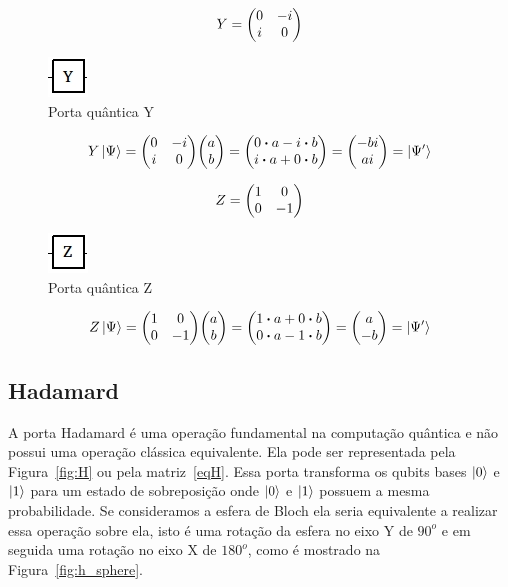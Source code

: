 \documentclass[a4paper, 12pt, oneside]{book}
\begin{document}
\begin{equation}\label{eqY}
Y =  \mqty(0&-i\\i&0)
\end{equation}

\begin{figure}[H]
\centering
\includegraphics[scale=0.75]{y.jpg}
\caption{Porta quântica Y}
\label{fig:y}
\end{figure}

\begin{align*}
Y\ket{\Psi} = \mqty(0&-i\\i&0)\mqty(a\\b) = \mqty(0 \vdot a-i \vdot b \\i \vdot a+0 \vdot b) = \mqty(-bi\\ai) = \ket{\Psi'}
\end{align*}

\begin{equation}\label{eqZ}
Z =  \mqty(1&0\\0&-1)
\end{equation}

\begin{figure}[H]
\centering
\includegraphics[scale=0.75]{z.jpg}
\caption{Porta quântica Z}
\label{fig:z}
\end{figure}

\begin{align*}
Z\ket{\Psi} = \mqty(1&0\\0&-1)\mqty(a\\b) = \mqty(1 \vdot a+0 \vdot b \\0 \vdot a-1 \vdot b) = \mqty(a\\-b) = \ket{\Psi'}
\end{align*}

\subsection{Hadamard} 
A porta Hadamard é uma operação fundamental na computação quântica e não possui uma operação clássica equivalente. Ela pode ser representada pela Figura~\ref{fig:H} ou pela matriz~\eqref{eqH}. Essa porta transforma os qubits bases $\ket{0}$ e $\ket{1}$ para um estado de sobreposição onde $\ket{0}$ e $\ket{1}$ possuem a mesma probabilidade. Se consideramos a esfera de Bloch ela seria equivalente a realizar essa operação sobre ela, isto é uma rotação da esfera no eixo Y de $90^o$ e em seguida uma rotação no eixo X de $180^o$, como é mostrado na Figura~\ref{fig:h_sphere}.
\end{document}
